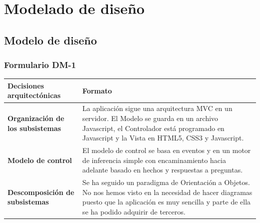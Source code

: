 \documentclass[a4paper,11pt]{article}
\begin{document}
	\section{Modelado de diseño}
		\subsection{Modelo de diseño}
			\subsubsection{Formulario DM-1}
			\begin{center}
				\begin{tabular}{| l | p{5cm} |}
					\hline
					\cellcolor[RGB]{224,233,250}\textbf{Decisiones arquitectónicas} &
					\cellcolor[RGB]{224,233,250}\textbf{Formato} \\
					\hline
					\cellcolor[RGB]{224,233,250}\textbf{Organización de los subsistemas} & La
					aplicación sigue una arquitectura MVC en un servidor. El Modelo se guarda en un archivo Javascript, el Controlador está programado en Javascript y la Vista en HTML5, CSS3 y Javascript.
					\\
					\hline
					\cellcolor[RGB]{224,233,250}\textbf{Modelo de control} & El modelo de
					control se basa en eventos y en un motor de inferencia simple con encaminamiento hacia adelante basado en hechos y respuestas a preguntas.\\
					\hline
					\cellcolor[RGB]{224,233,250}\textbf{Descomposición de subsistemas} & Se ha
					seguido un paradigma de Orientación a Objetos. No nos hemos visto en la necesidad de hacer diagramas puesto que la aplicación es muy sencilla y parte de ella se ha podido adquirir de terceros.\\
					\hline
				\end{tabular}
			\end{center}
			\newpage
\end{document}
